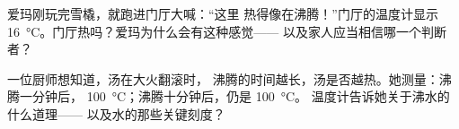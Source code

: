 \begin{exercise}[$\star\star$]\label{exo:g3:temperature-thermometers:10}
爱玛刚玩完雪橇，就跑进门厅大喊：“这里
热得像在沸腾！”门厅的温度计显示
\qty{16}{\celsius}。门厅热吗？爱玛为什么会有这种感觉——
以及家人应当相信哪一个判断者？
\end{exercise}

\begin{exercise}[$\star\star$]\label{exo:g3:temperature-thermometers:11}
一位厨师想知道，汤在大火翻滚时，
沸腾的时间越长，汤是否越热。她测量：沸腾一分钟后，
\qty{100}{\celsius}；沸腾十分钟后，仍是 \qty{100}{\celsius}。
温度计告诉她关于沸水的什么道理——
以及水的那些关键刻度？
\end{exercise}
